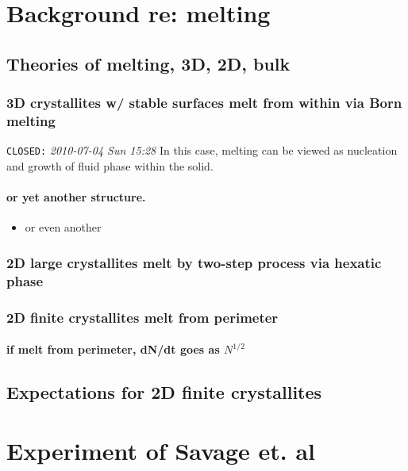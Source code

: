 \documentclass{umthesis}
\begin{document}
\section{Background re: melting}
\label{sec-1.1}
\subsection{Theories of melting, 3D, 2D, bulk}
\label{sec-1.1.1}
\subsubsection{3D crystallites w/ stable surfaces melt from within via Born melting}
\label{sec-1.1.1.1}

     \texttt{CLOSED:} \textit{2010-07-04 Sun 15:28}\newline
In this case, melting can be viewed as nucleation and growth of fluid phase within the solid.
\paragraph{or yet another structure.}
\label{sec-1.1.1.1.1}
\begin{itemize}

\item or even another\\
\label{sec-1.1.1.1.1.1}%
\end{itemize} %
\subsubsection{2D large crystallites melt by two-step process via hexatic phase}
\label{sec-1.1.1.2}
\subsubsection{2D finite crystallites melt from perimeter}
\label{sec-1.1.1.3}
\paragraph{if melt from perimeter, dN/dt goes as $N^{1/2}$}
\label{sec-1.1.1.3.1}
\subsection{Expectations for 2D finite crystallites}
\label{sec-1.1.2}
\section{Experiment of Savage et. al}
\label{sec-1.2}
\end{document}
